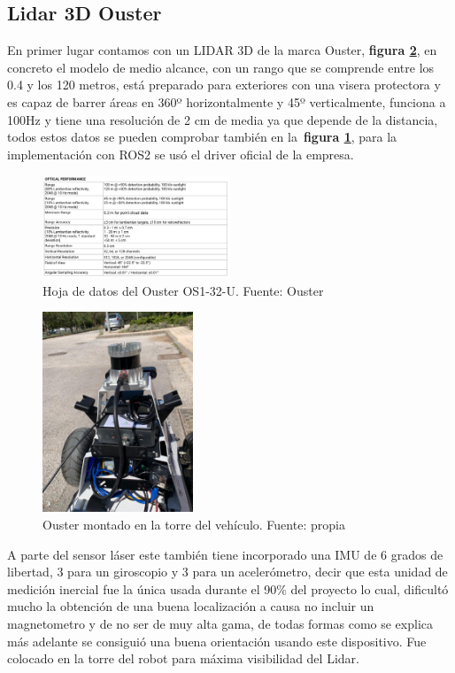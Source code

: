 \subsection{Lidar 3D Ouster}
En primer lugar contamos con un LIDAR 3D de la marca Ouster, \textbf{figura \ref{fig:ouster_hunter}}, en concreto el 
modelo de medio alcance, con un rango que se comprende entre los 0.4 y los 120 metros, está preparado para exteriores con una visera 
protectora y es capaz de barrer áreas en 360º horizontalmente y 45º verticalmente, funciona a 
100Hz y tiene una resolución de 2 cm de media ya que depende de la distancia, todos estos datos se pueden comprobar también en la~\textbf{figura \ref{fig:datasheet_ouster}}, 
para la implementación con ROS2 se usó el driver oficial de la empresa. 

\begin{figure}[h]
    \centering
    \includegraphics[width=0.5\textwidth]{images/osuter_datasheet.png}
    \caption{Hoja de datos del Ouster OS1-32-U. Fuente: Ouster}
    \label{fig:datasheet_ouster}
\end{figure}

\begin{figure}[H]
    \centering
    \includegraphics[width=0.4\textwidth]{images/ouster_hunter.jpeg}
    \caption{Ouster montado en la torre del vehículo. Fuente: propia}
    \label{fig:ouster_hunter}
\end{figure}

A parte del sensor láser este también tiene incorporado una IMU de 6 grados de libertad, 3 para un giroscopio y 3 para un acelerómetro, 
decir que esta unidad de medición inercial fue la única usada durante el 90\% del proyecto lo cual, dificultó mucho la obtención de una 
buena localización a causa no incluir un magnetometro y de no ser de muy alta gama, de todas formas como se explica más adelante se 
consiguió una buena orientación usando este dispositivo. Fue colocado en la torre del robot para máxima visibilidad del Lidar.

